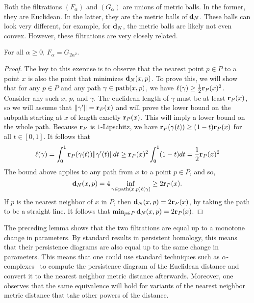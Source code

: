     Both the filtrations $(F_\alpha)$ and $(G_\alpha)$ are unions of metric balls.
    In the former, they are Euclidean.
    In the latter, they are the metric balls of $\mathbf{d}_N$.
    These balls can look very different, for example, for $\mathbf{d}_N$, the metric balls are likely not even convex.
    However, these filtrations are very closely related.
    \begin{lemma}
      For all $\alpha \ge 0$, $F_\alpha = G_{2\alpha^2}$.
    \end{lemma}
    \begin{proof}
      The key to this exercise is to observe that the nearest point $p \in P$ to a point $x$ is also the point that minimizes $\mathbf{d}_N(x,p)$.
      To prove this, we will show that for any $p\in P$ and any path $\gamma\in \mathrm{path}(x,p)$, we have $\ell(\gamma)\ge \frac{1}{2}\mathbf{r}_P(x)^2$.
      Consider any such $x$, $p$, and $\gamma$.
      The euclidean length of $\gamma$ must be at least $\mathbf{r}_P(x)$, so we will assume that $\|\gamma'\| = \mathbf{r}_P(x)$ and will prove the lower bound on the subpath starting at $x$ of length exactly $\mathbf{r}_P(x)$.
      This will imply a lower bound on the whole path.
      Because $\mathbf{r}_P$ is $1$-Lipschitz, we have $\mathbf{r}_P(\gamma(t))\ge (1-t)\mathbf{r}_P(x)$ for all $t\in [0,1]$.  It follows that
      \[
        \ell(\gamma) = \int_0^1 \mathbf{r}_P(\gamma(t))\|\gamma'(t)\|dt
          \ge \mathbf{r}_P(x)^2 \int_0^1 (1-t)dt
          =  \frac{1}{2}\mathbf{r}_P(x)^2
      \]
      The bound above applies to any path from $x$ to a point $p\in P$, and so,
      \[
        \mathbf{d}_N(x,p) = 4 \inf_{\gamma\in \mathrm{path}(x,p) \ell(\gamma)} \ge 2\mathbf{r}_P(x).
      \]
      If $p$ is the nearest neighbor of $x$ in $P$, then $\mathbf{d}_N(x,p) = 2\mathbf{r}_P(x)$, by taking the path to be a straight line.
      It follows that $\min_{p\in P}\mathbf{d}_N(x,p) = 2\mathbf{r}_P(x)$.
    \end{proof}

    The preceding lemma shows that the two filtrations are equal up to a monotone change in parameters.
    By standard results in persistent homology, this means that their persistence diagrams are also equal up to the same change in parameters.
    This means that one could use standard techniques such as $\alpha$-complexes~\cite{edelsbrunner02topological} to compute the persistence diagram of the Euclidean distance and convert it to the nearest neighbor metric distance afterwards.
    Moreover, one observes that the same equivalence will hold for variants of the nearest neighbor metric distance that take other powers of the distance.

